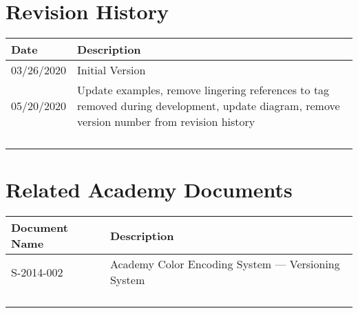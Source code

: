 \prelimsectionformat	%
\chapter{Revision History}

\begin{tabularx}{\linewidth}{|l|X|}
    \hline
    Date       & Description \\ \hline
    03/26/2020 & Initial Version \\ \hline
    05/20/2020 & Update examples, remove lingering references to tag removed during development, update diagram, remove version number from revision history \\ \hline
	&	\\ \hline
    &	\\ \hline
    &	\\ \hline
    &	\\ \hline
\end{tabularx}

\vspace{0.25in} %
\chapter{Related Academy Documents} %
\begin{tabularx}{\linewidth}{|l|X|}
    \hline
    Document Name & Description \\ \hline
    S-2014-002 & Academy Color Encoding System --- Versioning System\\ \hline
    & \\ \hline
    & \\ \hline
    & \\ \hline
    & \\ \hline
\end{tabularx}